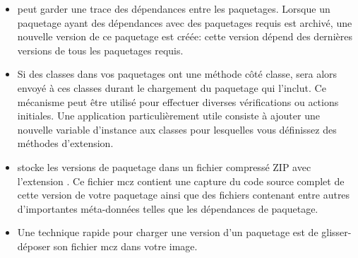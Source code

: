 \documentclass[a4paper,10pt,twoside]{book}
\begin{document}
\begin{itemize}
\item \MC peut garder une trace des dépendances entre les
  paquetages. Lorsque un paquetage ayant des dépendances avec des
  paquetages requis est archivé, une nouvelle version de ce paquetage
  est créée: cette version dépend des dernières versions de tous les
  paquetages requis. 

\item Si des classes dans vos paquetages ont une méthode
   côté classe,  sera alors envoyé à ces
  classes durant le chargement du paquetage qui l'inclut.
Ce mécanisme peut être utilisé pour effectuer diverses vérifications
ou actions initiales. %
Une application particulièrement utile consiste à ajouter une nouvelle
variable d'instance aux classes pour lesquelles vous définissez des
méthodes d'extension.

\item \MC stocke les versions de paquetage dans un fichier compressé
  ZIP avec l'extension . Ce fichier mcz contient une capture
  du code source complet de cette version de votre paquetage ainsi que
  des fichiers contenant entre autres d'importantes méta-données
  telles que les dépendances de paquetage.

\item Une technique rapide pour charger une version d'un paquetage est de
  glisser-déposer son fichier mcz dans votre image.






\end{itemize}
\end{document}
